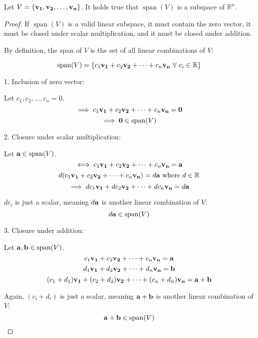 \documentclass[../main.tex]{subfiles}
\begin{document}
\begin{theorem}
	Let $V=\{ \mathbf{v_1}, \mathbf{v_2}, \ldots , \mathbf{v_n} \}$. It holds true that
	$\operatorname{span}(V)$ is a subspace of $\mathbb{R}^n$.
\end{theorem}

\begin{proof}
	If $\operatorname{span}(V)$ is a valid linear subspace, it must contain the zero vector,
	it must be closed under scalar multiplication, and it must be closed
	under addition.

	By definition, the span of $V$ is the set of all linear combinations of $V$:

	\begin{equation}
		\operatorname{span}(V)=\{ c_1\mathbf{v_1} + c_2\mathbf{v_2} + \dots + c_n\mathbf{v_n}\ \forall\ c_i \in \mathbb{R} \}
	\end{equation}

	1. Inclusion of zero vector:

	\begin{center}
		Let $c_1, c_2, \ldots , c_n=0$.
		$$\implies c_1\mathbf{v_1} + c_2\mathbf{v_2} + \dots + c_n\mathbf{v_n}=\mathbf{0}$$
		$$\implies \mathbf{0} \in \operatorname{span}(V)$$
	\end{center}

	2. Closure under scalar multiplication:

	\begin{center}
		Let $\mathbf{a} \in \operatorname{span}(V)$.
		$$\iff c_1\mathbf{v_1} + c_2\mathbf{v_2} + \dots + c_n\mathbf{v_n}=\mathbf{a}$$
		$$d(c_1\mathbf{v_1} + c_2\mathbf{v_2} + \dots + c_n\mathbf{v_n})=d\mathbf{a}\ \textnormal{where}\ d \in \mathbb{R}$$
		$$\implies dc_1\mathbf{v_1} + dc_2\mathbf{v_2} + \dots + dc_n\mathbf{v_n}=d\mathbf{a}$$
	\end{center}

	$dc_i$ is just a scalar, meaning $d\mathbf{a}$ is another
	linear combination of $V$:
	$$d\mathbf{a} \in \operatorname{span}(V)$$

	3. Closure under addition:

	\begin{center}
		Let $\mathbf{a}, \mathbf{b} \in \operatorname{span}(V)$.
		$$c_1\mathbf{v_1} + c_2\mathbf{v_2} + \dots + c_n\mathbf{v_n} = \mathbf{a}$$
		$$d_1\mathbf{v_1} + d_2\mathbf{v_2} + \dots + d_n\mathbf{v_n} = \mathbf{b}$$
		$$(c_1+d_1)\mathbf{v_1} + (c_2+d_2)\mathbf{v_2} + \dots + (c_n+d_n)\mathbf{v_n} = \mathbf{a} + \mathbf{b}$$
	\end{center}

	Again, $(c_i+d_i)$ is just a scalar, meaning $\mathbf{a}+\mathbf{b}$ is another linear combination of $V$:
	$$\mathbf{a}+\mathbf{b} \in \operatorname{span}(V)$$
\end{proof}
\end{document}
